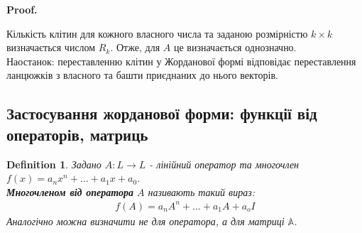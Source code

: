 \documentclass[a4paper, 10pt]{article}
\makeatletter
\def\qed{$\blacksquare$}
\theoremstyle{theoremdd}
\theoremstyle{theoremdd}
\newtheorem{definition}[theorem]{Definition}
\theoremstyle{theoremdd}
\theoremstyle{theoremdd}
\theoremstyle{theoremdd}
\theoremstyle{theoremdd}
\theoremstyle{theoremdd}
\theoremstyle{theoremdd}
\renewenvironment{proof}[1][Proof.\\]{\par
\pushQED{\hfill \qed}%
\normalfont \topsep6\p@\@plus6\p@\relax
\trivlist
\item\relax
{\bfseries
#1\@addpunct{.}}\hspace\labelsep\ignorespaces
}{%
\popQED\endtrivlist\@endpefalse
}
\makeatother
\begin{document}
\begin{proof}
Кількість клітин для кожного власного числа та заданою розмірністю $k \times k$ визначається числом $R_k$. Отже, для $A$ це визначається однозначно.\\
Наостанок: переставленню клітин у Жорданової формі відповідає переставлення ланцюжків з власного та башти приєднаних до нього векторів.
\end{proof}


\subsection{Застосування жорданової форми: функції від операторів, матриць}
\begin{definition}
Задано $A: L \to L$ - лінійний оператор та многочлен $f(x) = a_n x^n + \dots + a_1 x + a_0$.\\
\textbf{Многочленом від оператора} $A$ називають такий вираз:
\begin{align*}
f(A) = a_n A^n + \dots + a_1 A + a_o I
\end{align*}
Аналогічно можна визначити не для оператора, а для матриці $\mathbb{A}$.
\end{definition}
\end{document}
